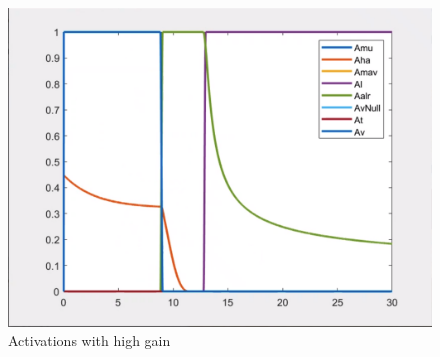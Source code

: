 \documentclass{article}
\begin{document}
\begin{figure}[htpb]
\begin{minipage}{0.40\textwidth}
\includegraphics[width=\textwidth]{313_b_Activation.png}
\caption{Activations with high gain}\label{act_w_b} 
\end{minipage}
\end{figure}
\end{document}
